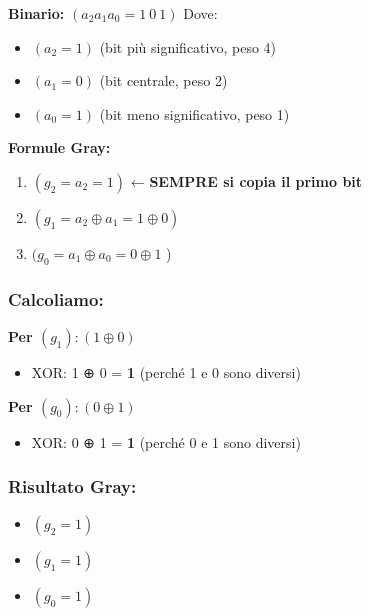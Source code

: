 \documentclass[
]{article}
\providecommand{\tightlist}{%
  \setlength{\itemsep}{0pt}\setlength{\parskip}{0pt}}
\begin{document}
\textbf{Binario:} \(( a_2 a_1 a_0 = 1 \ 0 \ 1 )\)
Dove:

\begin{itemize}
\tightlist
\item
  \(( a_2 = 1 )\) (bit più significativo, peso 4)
\item
  \(( a_1 = 0 )\) (bit centrale, peso 2)
\item
  \(( a_0 = 1 )\) (bit meno significativo, peso 1)
\end{itemize}

\textbf{Formule Gray:}

\begin{enumerate}
\def\labelenumi{\arabic{enumi}.}
\tightlist
\item
  \(( g_2 = a_2 = 1 )\) ← \textbf{SEMPRE si copia il primo bit}
\item
  \(( g_1 = a_2 \oplus a_1 = 1 \oplus 0 )\)
\item
  \((g_0 = a_1 \oplus a_0 = 0 \oplus 1\) )
\end{enumerate}

\hypertarget{calcoliamo}{%
\subsubsection{\texorpdfstring{\textbf{Calcoliamo:}}{Calcoliamo:}}\label{calcoliamo}}

\textbf{Per \(( g_1 ): ( 1 \oplus 0 )\)}

\begin{itemize}
\tightlist
\item
  XOR: 1 ⊕ 0 = \textbf{1} (perché 1 e 0 sono diversi)
\end{itemize}

\textbf{Per \(( g_0 ): ( 0 \oplus 1 )\)}

\begin{itemize}
\tightlist
\item
  XOR: 0 ⊕ 1 = \textbf{1} (perché 0 e 1 sono diversi)
\end{itemize}

\hypertarget{risultato-gray}{%
\subsubsection{\texorpdfstring{\textbf{Risultato Gray:}}{Risultato Gray:}}\label{risultato-gray}}

\begin{itemize}
\tightlist
\item
  \(( g_2 = 1 )\)
\item
  \(( g_1 = 1 )\)
\item
  \(( g_0 = 1)\)
\end{itemize}
\end{document}
